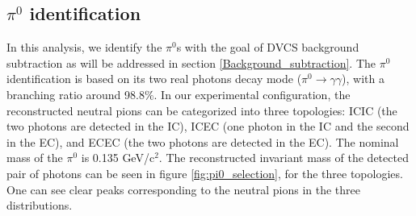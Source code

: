 \subsection{$\pi^{0}$ identification}
In this analysis, we identify the $\pi^{0}$s with the goal of DVCS background subtraction as will be addressed in section \ref{Background_subtraction}. The $\pi^{0}$ identification is based on its two real photons decay mode ($\pi^{0} \rightarrow \gamma \gamma$), with a branching ratio around 98.8$\%$. In our experimental configuration, the reconstructed neutral pions can be categorized into three topologies: ICIC (the two photons are detected in the IC), ICEC (one photon in the IC and the second in the EC), and ECEC (the two photons are detected in the EC). The nominal mass of the $\pi^{0}$ is 0.135 GeV/c$^{2}$. The reconstructed invariant mass of the detected pair of photons can be seen in figure \ref{fig:pi0_selection}, for the three topologies. One can see clear peaks corresponding to the neutral pions in the three distributions.
